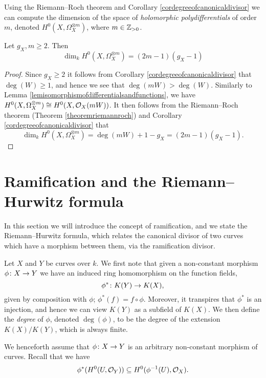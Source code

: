 Using the Riemann--Roch theorem and Corollary \ref{cordegreeofcanonicaldivisor} we can compute the dimension of the space of \emph{holomorphic polydifferentials} of order $m$, denoted $H^0(X,\Omega_X^{\otimes m})$, where $m \in {\mathbb Z}_{> 0}$.

    \begin{cor}\label{dim3}
    Let $g_X, m\geq 2$. Then
        \begin{equation}
        \dim_kH^0(X,\Omega_X^{\otimes m}) = (2m-1)(g_X-1) 
        \end{equation}
    \end{cor}
    \begin{proof}
    Since $g_X\geq 2$ it follows from Corollary \ref{cordegreeofcanonicaldivisor} that $\deg(W)\geq1$, and hence we see that $\deg(mW)>\deg(W)$.
    Similarly to Lemma \ref{lemisomorphismofdifferentialsandfunctions}, we have $H^0(X,\Omega_X^{\otimes m}) \cong H^0(X,{\cal O}_X(mW))$.
    It then follows from the Riemann--Roch theorem (Theorem \ref{theoremriemannroch}) and Corollary \ref{cordegreeofcanonicaldivisor} that
        \[
        \dim_kH^0(X,\Omega_X^{\otimes m})=\deg(mW)+1-g_X=(2m-1)(g_X-1).
        \]
    \end{proof}


\section{Ramification and the Riemann--Hurwitz formula}

In this section we will introduce the concept of ramification, and we state the Riemann--Hurwitz formula, which relates the canonical divisor of two curves which have a morphism between them, via the ramification divisor.



Let $X$ and $Y$ be curves over $k$.
We first note that given a non-constant morphism $\phi \colon X \rightarrow Y$ we have an induced ring homomorphism on the function fields,
    \[
    \phi^* \colon K(Y) \rightarrow K(X),
    \]
given by composition with $\phi$; \ie $\phi^*(f) = f \circ \phi$.
Moreover, it transpires that $\phi^*$ is an injection, and hence we can view $K(Y)$ as a subfield of $K(X)$.
We then define the \emph{degree} of $\phi$, denoted $\deg(\phi)$, to be the degree of the extension $K(X)/K(Y)$, which is always finite.

We henceforth assume that $\phi \colon X \rightarrow Y$ is an arbitrary non-constant morphism of curves.
Recall that we have
    \[
    \phi^*(H^0(U,{\cal O}_Y)) \subseteq H^0(\phi^{-1}(U),{\cal O}_X).
    \]

